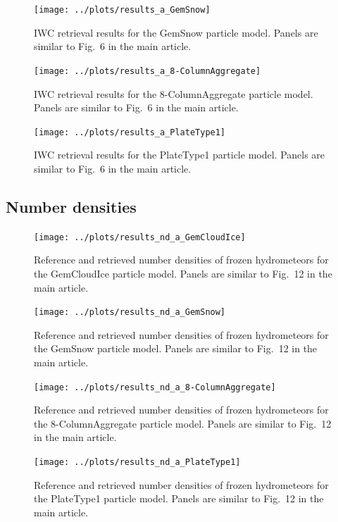 \documentclass[journal abbreviation, manuscript]{copernicus}
\begin{document}
\clearpage

\begin{figure}[!hbpt]
\centering
\texttt{[image: ../plots/results\_a\_GemSnow]}
\caption{IWC retrieval results for the GemSnow particle model. Panels are similar to
  Fig.~6 in the main article.}
\end{figure}
\clearpage

\begin{figure}[!hbpt]
\centering
\texttt{[image: ../plots/results\_a\_8-ColumnAggregate]}
\caption{IWC retrieval results for the 8-ColumnAggregate particle model. Panels are similar to
  Fig.~6 in the main article.}
\end{figure}
\clearpage

\begin{figure}[!hbpt]
\centering
\texttt{[image: ../plots/results\_a\_PlateType1]}
\caption{IWC retrieval results for the PlateType1 particle model. Panels are similar to
  Fig.~6 in the main article.}
\end{figure}
\clearpage

\subsection{Number densities}

\begin{figure}[!hbpt]
\centering
\texttt{[image: ../plots/results\_nd\_a\_GemCloudIce]}
\caption{Reference and retrieved number densities of frozen hydrometeors for the
  GemCloudIce particle model. Panels are similar to Fig.~12 in the main article.}
\end{figure}
\clearpage

\begin{figure}[!hbpt]
\centering
\texttt{[image: ../plots/results\_nd\_a\_GemSnow]}
\caption{Reference and retrieved number densities of frozen hydrometeors for the
  GemSnow particle model. Panels are similar to Fig.~12 in the main article.}
\end{figure}
\clearpage

\begin{figure}[!hbpt]
\centering
\texttt{[image: ../plots/results\_nd\_a\_8-ColumnAggregate]}
\caption{Reference and retrieved number densities of frozen hydrometeors for the
  8-ColumnAggregate particle model. Panels are similar to Fig.~12 in the main article.}
\end{figure}
\clearpage

\begin{figure}[!hbpt]
\centering
\texttt{[image: ../plots/results\_nd\_a\_PlateType1]}
\caption{Reference and retrieved number densities of frozen hydrometeors for the
  PlateType1 particle model. Panels are similar to Fig.~12 in the main article.}
\end{figure}
\clearpage
\end{document}
